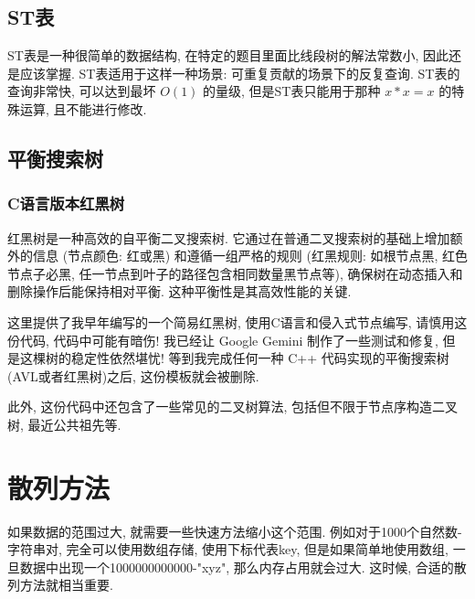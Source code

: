 \documentclass[a4paper]{ctexart}
\begin{document}
\subsection{ST表}

ST表是一种很简单的数据结构, 在特定的题目里面比线段树的解法常数小, 因此还是应该掌握. ST表适用于这样一种场景: 可重复贡献的场景下的反复查询. ST表的查询非常快, 可以达到最坏 $O(1)$ 的量级, 但是ST表只能用于那种 $x*x=x$ 的特殊运算, 且不能进行修改.



\subsection{平衡搜索树}

\subsubsection*{C语言版本红黑树}

红黑树是一种高效的自平衡二叉搜索树. 它通过在普通二叉搜索树的基础上增加额外的信息 (节点颜色: 红或黑) 和遵循一组严格的规则 (红黑规则: 如根节点黑, 红色节点子必黑, 任一节点到叶子的路径包含相同数量黑节点等), 确保树在动态插入和删除操作后能保持相对平衡. 这种平衡性是其高效性能的关键.

这里提供了我早年编写的一个简易红黑树, 使用C语言和侵入式节点编写, 请慎用这份代码, 代码中可能有暗伤! 我已经让 Google Gemini 制作了一些测试和修复, 但是这棵树的稳定性依然堪忧! 等到我完成任何一种 C++ 代码实现的平衡搜索树(AVL或者红黑树)之后, 这份模板就会被删除.

此外, 这份代码中还包含了一些常见的二叉树算法, 包括但不限于节点序构造二叉树, 最近公共祖先等.



\section{散列方法}

如果数据的范围过大, 就需要一些快速方法缩小这个范围. 例如对于1000个自然数-字符串对, 完全可以使用数组存储, 使用下标代表key, 但是如果简单地使用数组, 一旦数据中出现一个1000000000000-"xyz", 那么内存占用就会过大. 这时候, 合适的散列方法就相当重要.


\end{document}
